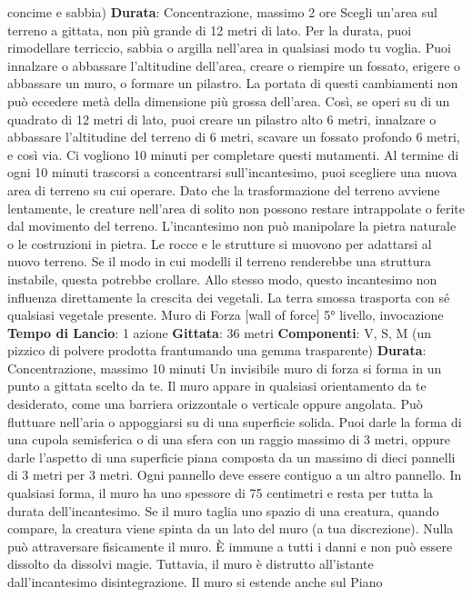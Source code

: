 \begin{multicols}{2}
concime e sabbia)
\textbf{Durata}: Concentrazione, massimo 2 ore
Scegli un’area sul terreno a gittata, non più grande di
12 metri di lato. Per la durata, puoi rimodellare terriccio,
sabbia o argilla nell’area in qualsiasi modo tu voglia.
Puoi innalzare o abbassare l’altitudine dell’area, creare
o riempire un fossato, erigere o abbassare un muro, o
formare un pilastro. La portata di questi cambiamenti
non può eccedere metà della dimensione più grossa
dell’area. Così, se operi su di un quadrato di 12 metri di
lato, puoi creare un pilastro alto 6 metri, innalzare o
abbassare l’altitudine del terreno di 6 metri, scavare un
fossato profondo 6 metri, e così via. Ci vogliono 10
minuti per completare questi mutamenti.
Al termine di ogni 10 minuti trascorsi a concentrarsi
sull’incantesimo, puoi scegliere una nuova area di
terreno su cui operare.
Dato che la trasformazione del terreno avviene
lentamente, le creature nell’area di solito non possono
restare intrappolate o ferite dal movimento del terreno.
L’incantesimo non può manipolare la pietra naturale o
le costruzioni in pietra. Le rocce e le strutture si
muovono per adattarsi al nuovo terreno. Se il modo in
cui modelli il terreno renderebbe una struttura instabile,
questa potrebbe crollare.
Allo stesso modo, questo incantesimo non influenza
direttamente la crescita dei vegetali. La terra smossa
trasporta con sé qualsiasi vegetale presente.
Muro di Forza
[wall of force]
5° livello, invocazione
\textbf{Tempo di Lancio}: 1 azione
\textbf{Gittata}: 36 metri
\textbf{Componenti}: V, S, M (un pizzico di polvere prodotta
frantumando una gemma trasparente)
\textbf{Durata}: Concentrazione, massimo 10 minuti
Un invisibile muro di forza si forma in un punto a gittata
scelto da te. Il muro appare in qualsiasi orientamento
da te desiderato, come una barriera orizzontale o
verticale oppure angolata. Può fluttuare nell’aria o
appoggiarsi su di una superficie solida. Puoi darle la
forma di una cupola semisferica o di una sfera con un
raggio massimo di 3 metri, oppure darle l’aspetto di una
superficie piana composta da un massimo di dieci
pannelli di 3 metri per 3 metri. Ogni pannello deve
essere contiguo a un altro pannello. In qualsiasi forma,
il muro ha uno spessore di 75 centimetri e resta per
tutta la durata dell’incantesimo. Se il muro taglia uno
spazio di una creatura, quando compare, la creatura
viene spinta da un lato del muro (a tua discrezione).
Nulla può attraversare fisicamente il muro. È immune a
tutti i danni e non può essere dissolto da dissolvi magie.
Tuttavia, il muro è distrutto all’istante dall’incantesimo
disintegrazione. Il muro si estende anche sul Piano

\end{multicols}
